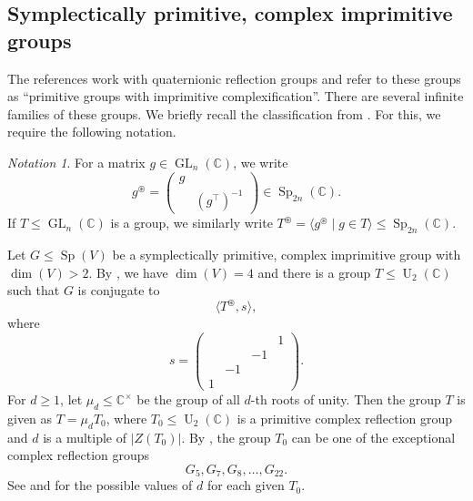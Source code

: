 \documentclass[a4paper]{amsart}
\theoremstyle{plain}
\theoremstyle{definition}
\theoremstyle{remark}
\newtheorem{notation}[theorem]{Notation}
\DeclareMathOperator{\GL}{GL}
\DeclareMathOperator{\Sp}{Sp}
\DeclareMathOperator{\U}{U}
\newcommand{\CC}{\mathbb C}
\begin{document}
\subsection{Symplectically primitive, complex imprimitive groups}
The references \cite{Coh80, RS26} work with quaternionic reflection groups and refer to these groups as \enquote{primitive groups with imprimitive complexification}. There are several infinite families of these groups. We briefly recall the classification from \cite[Sect.~3]{Coh80}.
For this, we require the following notation.

\begin{notation}
  For a matrix \(g\in \GL_n(\CC)\), we write \[g^\circledast = \begin{pmatrix} g & \\ & (g^\top)^{-1}\end{pmatrix}\in \Sp_{2n}(\CC).\]
  If \(T\leqslant\GL_n(\CC)\) is a group, we similarly write \(T^\circledast = \langle g^\circledast\mid g\in T\rangle \leqslant \Sp_{2n}(\CC)\).
\end{notation}

Let \(G\leqslant\Sp(V)\) be a symplectically primitive, complex imprimitive group with \(\dim(V) > 2\).
By \cite[Thm.~3.6]{Coh80}, we have \(\dim(V) = 4\) and there is a group \(T \leqslant \U_2(\CC)\) such that \(G\) is conjugate to \[\langle T^\circledast, s\rangle,
\] where \[s = \begin{pmatrix} & & & 1\\ & & -1 & \\ & -1 & & \\ 1 & & & \end{pmatrix}.\]
For \(d\geqslant 1\), let \(\mu_d \leqslant \CC^\times\) be the group of all \(d\)-th roots of unity.
Then the group \(T\) is given as \(T = \mu_d T_0\), where \(T_0\leqslant \U_2(\CC)\) is a primitive complex reflection group and \(d\) is a multiple of \(|{Z(T_0)}|\).
By \cite[Lem.~3.3]{Coh80}, the group \(T_0\) can be one of the exceptional complex reflection groups \[G_5, G_7, G_8,\dots, G_{22}.\]
See \cite[Lem.~3.3]{Coh80} and \cite[Thm.~7.9]{Tay25} for the possible values of \(d\) for each given \(T_0\).
\end{document}
